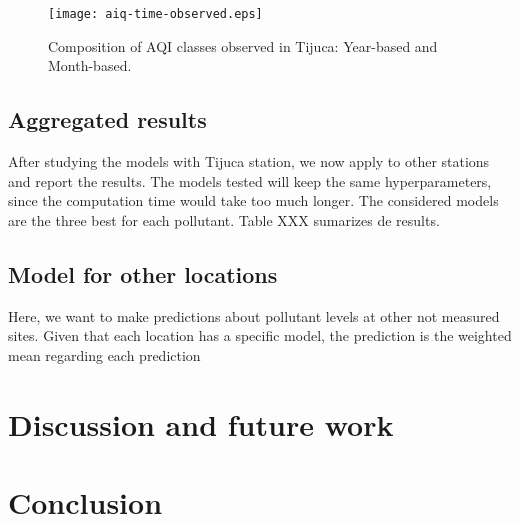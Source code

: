 \begin{figure}
    \centering
    \texttt{[image: aiq-time-observed.eps]}
    \caption{Composition of AQI classes observed in Tijuca: Year-based and Month-based.}
    \label{fig:aqitime-observed}
\end{figure}

\subsection{Aggregated results}

After studying the models with Tijuca station, we now apply to other stations
and report the results. The models tested will keep the same hyperparameters,
since the computation time would take too much longer. The considered models
are the three best for each pollutant. Table XXX sumarizes de results.  

\subsection{Model for other locations}

Here, we want to make predictions about pollutant levels at other not measured
sites. Given that each location has a specific model, the prediction
is the weighted mean regarding each prediction 

\section{Discussion and future work}
\label{sec:discussion}


\section{Conclusion}
\label{sec:conclusion}
